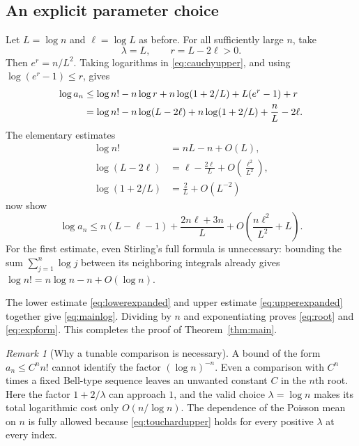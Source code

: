 \documentclass[11pt]{article}
\numberwithin{equation}{section}
\theoremstyle{remark}
\newtheorem{remark}[theorem]{Remark}
\begin{document}
\subsection{An explicit parameter choice}

Let $L=\log n$ and $\ell=\log L$ as before. For all sufficiently large
$n$, take
\begin{equation}\label{eq:parameters}
 \lambda=L,\qquad r=L-2\ell>0.
\end{equation}
Then $e^r=n/L^2$. Taking logarithms in \eqref{eq:cauchyupper}, and using
$\log(e^r-1)\le r$, gives
\begin{align}
 \log a_n
 &\le \log n!-n\log r
       +n\log(1+2/L)
       +L(e^r-1)+r\notag\\
 &=\log n!-n\log(L-2\ell)
       +n\log(1+2/L)+\frac nL-2\ell.\label{eq:explicitupperlog}
\end{align}
The elementary estimates
\begin{align*}
 \log n!&=nL-n+O(L),\\
 \log(L-2\ell)&=\ell-\frac{2\ell}{L}
                         +O\!\left(\frac{\ell^2}{L^2}\right),\\
 \log(1+2/L)&=\frac2L+O(L^{-2})
\end{align*}
now show
\begin{equation}\label{eq:upperexpanded}
 \log a_n\le n(L-\ell-1)
     +\frac{2n\ell+3n}{L}
     +O\!\left(\frac{n\ell^2}{L^2}+L\right).
\end{equation}
For the first estimate, even Stirling's full formula is unnecessary:
bounding the sum $\sum_{j=1}^n\log j$ between its neighboring integrals
already gives $\log n!=n\log n-n+O(\log n)$.

The lower estimate \eqref{eq:lowerexpanded} and upper estimate
\eqref{eq:upperexpanded} together give \eqref{eq:mainlog}. Dividing by
$n$ and exponentiating proves \eqref{eq:root} and \eqref{eq:expform}.
This completes the proof of Theorem~\ref{thm:main}.

\begin{remark}[Why a tunable comparison is necessary]
A bound of the form $a_n\le C^n n!$ cannot identify the factor
$(\log n)^{-n}$. Even a comparison with $C^n$ times a fixed Bell-type
sequence leaves an unwanted constant $C$ in the $n$th root. Here the
factor $1+2/\lambda$ can approach $1$, and the valid choice
$\lambda=\log n$ makes its total logarithmic cost only $O(n/\log n)$.
The dependence of the Poisson mean on $n$ is fully allowed because
\eqref{eq:touchardupper} holds for every positive $\lambda$ at every
index.
\end{remark}
\end{document}
